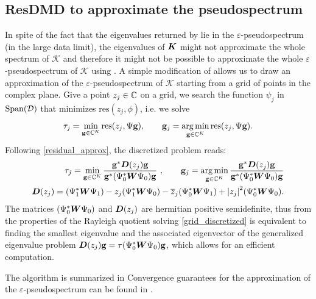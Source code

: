 \subsection{ResDMD to approximate the pseudospectrum}
In spite of the fact that the eigenvalues returned by  lie in the $\varepsilon$-pseudospectrum (in the large data limit), the eigenvalues of $\vb*{K}$ might not approximate the whole spectrum of $\mathcal{K}$ and therefore it might not be possible to approximate the whole $\varepsilon$-pseudospectrum of $\mathcal{K}$ using . A simple modification of  allows us to draw an approximation of the $\varepsilon$-pseudospectrum of $\mathcal{K}$ starting from a grid of points in the complex plane. Give a point $z_j\in\mathbb{C}$ on a grid, we search the function $\psi_j$ in $\mathrm{Span}(\mathcal{D})$ that minimizes $\mathrm{res}(z_j, \phi)$, i.e. we solve
\begin{equation}
    \label{grid_continuous}
    \tau_j = \min_{\vb{g}\in\mathbb{C}^K} \mathrm{res}(z_j, \Psi\vb{g}), \qquad \vb{g}_j = \operatorname*{arg\,min}_{\vb{g}\in\mathbb{C}^K} \mathrm{res}(z_j, \Psi\vb{g}).
\end{equation}
Following \eqref{residual_approx}, the discretized problem reads:
\begin{align}
    \label{grid_discretized}
    \tau_j = \min_{\vb{g}\in\mathbb{C}^K} \frac{\vb{g}^*\vb*{D}(z_j)\vb{g}}{\vb{g}^*(\Psi_0^*\vb*{W}\Psi_0)\vb{g}}\,\,, \qquad \vb{g}_j = \operatorname*{arg\,min}_{\vb{g}\in\mathbb{C}^K} \frac{\vb{g}^*\vb*{D}(z_j)\vb{g}}{\vb{g}^*(\Psi_0^*\vb*{W}\Psi_0)\vb{g}} \\
    \label{D(z)_definition}
    \vb*{D}(z_j) = (\Psi_1^*\vb*{W}\Psi_1) - z_j (\Psi_1^*\vb*{W}\Psi_0) - \overline{z}_j(\Psi_0^*\vb*{W}\Psi_1) + \abs{z_j}^2 (\Psi_0^*\vb*{W}\Psi_0).
\end{align}
The matrices $(\Psi_0^*\vb*{W}\Psi_0)$ and $\vb*{D}(z_j)$ are hermitian positive semidefinite, thus from the properties of the Rayleigh quotient solving \eqref{grid_discretized} is equivalent to finding the smallest eigenvalue and the associated eigenvector of the generalized eigenvalue problem $\vb*{D}(z_j)\vb{g} = \tau(\Psi_0^*\vb*{W}\Psi_0)\vb{g}$, which allows for an efficient computation.

The algorithm is summarized in  Convergence guarantees for the approximation of the $\varepsilon$-pseudospectrum can be found in \cite{colbrook_rigorous_2021}.

